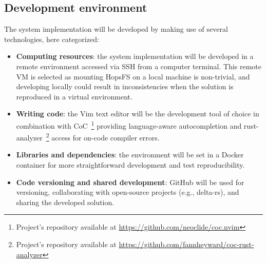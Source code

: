 \subsection{Development environment}
The system implementation will be developed by making use of several technologies, here categorized:
\begin{itemize}
    \item \textbf{Computing resources}: the system implementation will be developed in a remote environment accessed via \gls{SSH} from a computer terminal. This remote \gls{VM} is selected as mounting \gls{HopsFS} on a local machine is non-trivial, and developing locally could result in inconsistencies when the solution is reproduced in a virtual environment.
    \item \textbf{Writing code}: the Vim text editor will be the development tool of choice in combination with \gls{CoC}~\footnote{Project's repository available at \url{https://github.com/neoclide/coc.nvim}} providing language-aware autocompletion and rust-analyzer~\footnote{Project's repository available at \url{https://github.com/fannheyward/coc-rust-analyzer}} access for on-code compiler errors. 
    \item \textbf{Libraries and dependencies}: the environment will be set in a Docker container for more straightforward development and test reproducibility.
    \item \textbf{Code versioning and shared development}: GitHub will be used for versioning, collaborating with open-source projects (e.g., delta-rs), and sharing the developed solution.
\end{itemize}

 